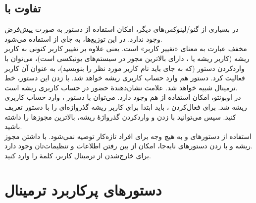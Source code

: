 \subsection[تفاوت sudo با su]{تفاوت  با }
در بسیاری از گنو/لینوکس‌های دیگر، امکان استفاده از دستور  به صورت پیش‌فرض وجود ندارد. در این توزیع‌ها، به جای  از  استفاده می‌شود.\\
 مخفف عبارت  به معنای «تغییر کاربر» است. یعنی علاوه بر تغییر کاربر کنونی به کاربر ریشه (کاربر ریشه یا ، دارای بالاترین مجوز در سیستم‌های یونیکسی است)، می‌توان با واردکردن دستور  (که به جای  باید نام کاربر مورد نظر را بنویسید)، به عنوان آن کاربر فعالیت کرد. دستور  هم وارد حساب کاربری ریشه خواهد شد. با زدن این دستور، خط ترمینال شبیه  خواهد شد. علامت \lr{\texttt{\#}} نشان‌دهندهٔ حضور در حساب کاربری ریشه است.\\
در اوبونتو، امکان استفاده از  هم وجود دارد. می‌توان با دستور ، وارد حساب کاربری ریشه شد. برای فعال‌کردن ، باید ابتدا برای کاربر ریشه گذرواژه‌ای را با دستور  تعریف کنید. سپس می‌توانید با زدن  و واردکردن گذرواژهٔ ریشه، بالاترین مجوزها را داشته باشید.\\
استفاده از دستورهای  و  به هیچ وجه برای افراد تازه‌کار توصیه نمی‌شود. با داشتن مجوز ریشه و با زدن دستورهای نابه‌جا، امکان از بین رفتن اطلاعات و تنظیمات‌تان وجود دارد.\\
برای خارج‌شدن از ترمینال کاربر، کلمهٔ  را وارد کنید.

\section{دستورهای پرکاربرد ترمینال}
